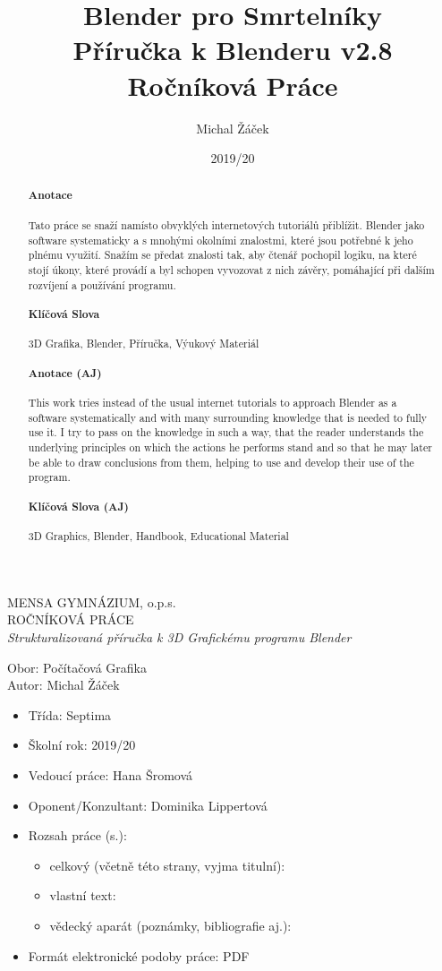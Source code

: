 \documentclass[12pt,a4paper]{report}
\author{Michal Žáček}
\title{{\Huge Blender pro Smrtelníky}\\ {\Large Příručka k Blenderu v2.8} \\ {\large Ročníková Práce}}
\date{2019/20}
\begin{document}
		\maketitle
	\pagebreak
	{
		\centering
	{\Huge MENSA GYMNÁZIUM, o.p.s.} \\
	{\Large ROČNÍKOVÁ PRÁCE} \\
	
	\textit{Strukturalizovaná příručka k 3D Grafickému programu Blender}
	
	{\large Obor: Počítačová Grafika
\\
		Autor: Michal Žáček \\}
	}
	\begin{itemize}
	\item[] Třída: Septima
	\item[] Školní rok: 2019/20
	\item[] Vedoucí práce: Hana Šromová
	\item[] Oponent/Konzultant: Dominika Lippertová
	\item[] Rozsah práce (s.):
	\begin{itemize}
		\item[] celkový (včetně této strany, vyjma titulní): 
		\item[] vlastní text:
		\item[] vědecký aparát (poznámky, bibliografie aj.):
	\end{itemize}
	\item[] Formát elektronické podoby práce: PDF
	\end{itemize}
\begin{abstract}
	\paragraph{Anotace} Tato práce se snaží namísto obvyklých internetových tutoriálů přiblížit. Blender jako software systematicky a s mnohými okolními znalostmi,
	které jsou potřebné k jeho plnému využití. Snažím se předat znalosti
	tak, aby čtenář pochopil logiku, na které stojí úkony, které provádí a
	byl schopen vyvozovat z nich závěry, pomáhající při dalším rozvíjení a
	používání programu.
	\paragraph{Klíčová Slova} 3D Grafika, Blender, Příručka, Výukový Materiál
	\paragraph{Anotace (AJ)} This work tries instead of the usual internet tutorials to approach
	Blender as a software systematically and with many surrounding
	knowledge that is needed to fully use it. I try to pass on the knowledge
	in such a way, that the reader understands the underlying principles on
	which the actions he performs stand and so that he may later be able
	to draw conclusions from them, helping to use and develop their use of
	the program.
	\paragraph{Klíčová Slova (AJ)} 3D Graphics, Blender, Handbook, Educational Material
\end{abstract}
\end{document}
